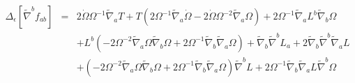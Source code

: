 \documentclass[10pt,letterpaper]{article}
\numberwithin{equation}{section}
\begin{document}
\begin{eqnarray}
\Delta_\epsilon\left[ \tilde\nabla^b f_{ab}\right] &=& 2 \dot{\Omega} \Omega^{-1} \tilde{\nabla}_{a}T + T (2 \Omega^{-1} \tilde{\nabla}_{a}\dot{\Omega} - 2 \dot{\Omega} \Omega^{-2} \tilde{\nabla}_{a}\Omega) + 2 \Omega^{-1} \tilde{\nabla}_{a}L^{b} \tilde{\nabla}_{b}\Omega \nonumber \\ 
&& + L^{b} (-2 \Omega^{-2} \tilde{\nabla}_{a}\Omega \tilde{\nabla}_{b}\Omega + 2 \Omega^{-1} \tilde{\nabla}_{b}\tilde{\nabla}_{a}\Omega) + \tilde{\nabla}_{b}\tilde{\nabla}^{b}L_{a} + 2 \tilde{\nabla}_{b}\tilde{\nabla}^{b}\tilde{\nabla}_{a}L \nonumber \\ 
&& + (-2 \Omega^{-2} \tilde{\nabla}_{a}\Omega \tilde{\nabla}_{b}\Omega + 2 \Omega^{-1} \tilde{\nabla}_{b}\tilde{\nabla}_{a}\Omega) \tilde{\nabla}^{b}L + 2 \Omega^{-1} \tilde{\nabla}_{b}\tilde{\nabla}_{a}L \tilde{\nabla}^{b}\Omega 
\end{eqnarray}

\end{document}

